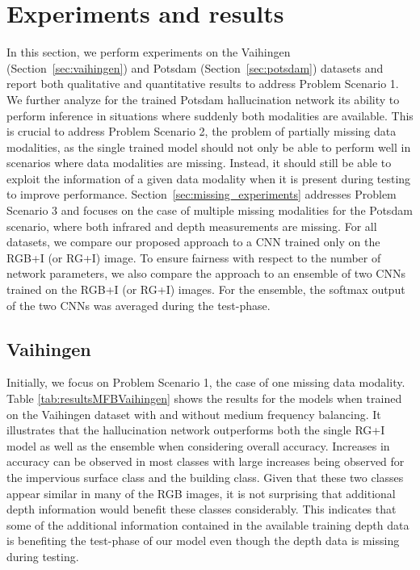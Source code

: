\documentclass[journal]{IEEEtran}
\begin{document}
\section{Experiments and results}
\label{sec:experiments}
In this section, we perform experiments on the Vaihingen (Section~\ref{sec:vaihingen}) and Potsdam (Section~\ref{sec:potsdam}) datasets and report both qualitative and quantitative results to address Problem Scenario 1. 
We further analyze for the trained Potsdam hallucination network its ability to perform inference in situations where suddenly both modalities are available. This is crucial to address Problem Scenario 2, the problem of partially missing data modalities, as the single trained model should not only be able to perform well in scenarios where data modalities are missing. Instead, it should still be able to exploit the information of a given data modality when it is present during testing to improve performance. 
Section~\ref{sec:missing_experiments} addresses Problem Scenario 3 and focuses on the case of multiple missing modalities for the Potsdam scenario, where both infrared and depth measurements are missing. For all datasets, we compare our proposed approach to a CNN trained only on the RGB+I (or RG+I) image. To ensure fairness with respect to the number of network parameters, we also compare the approach to an ensemble of two CNNs trained on the RGB+I (or RG+I) images. For the ensemble, the softmax output of the two CNNs was averaged during the test-phase. 

\subsection{Vaihingen}
Initially, we focus on Problem Scenario 1, the case of one missing data modality.
Table \ref{tab:resultsMFBVaihingen} shows the results for the models when trained on the Vaihingen dataset with and without medium frequency balancing. It illustrates that the hallucination network outperforms both the single RG+I model as well as the ensemble when considering overall accuracy. Increases in accuracy can be observed in most classes with large increases being observed for the impervious surface class and the building class. Given that these two classes appear similar in many of the RGB images, it is not surprising that additional depth information would benefit these classes considerably. This indicates that some of the additional information contained in the available training depth data is benefiting the test-phase of our model even though the depth data is missing during testing.
\end{document}
